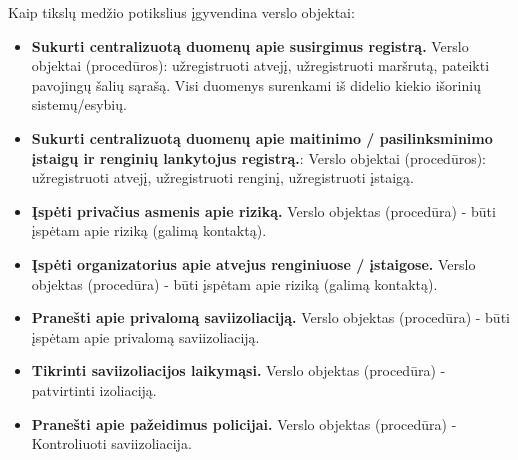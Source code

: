 \documentclass{VUMIFPSkursinis}
\begin{document}
\noindent Kaip tikslų medžio potikslius įgyvendina verslo objektai:
\begin{itemize}
	\item \textbf{Sukurti centralizuotą duomenų apie susirgimus registrą.} Verslo objektai (procedūros):  užregistruoti atvejį, užregistruoti maršrutą, pateikti pavojingų šalių sąrašą. Visi duomenys surenkami iš didelio kiekio išorinių sistemų/esybių.
	\item \textbf{Sukurti centralizuotą duomenų apie maitinimo / pasilinksminimo įstaigų ir renginių lankytojus registrą.}: Verslo objektai (procedūros): užregistruoti atvejį, užregistruoti renginį, užregistruoti įstaigą.
	\item \textbf{Įspėti privačius asmenis apie riziką.} Verslo objektas (procedūra) - būti įspėtam apie riziką (galimą kontaktą).
	\item \textbf{Įspėti organizatorius apie atvejus renginiuose / įstaigose.} Verslo objektas (procedūra) - būti įspėtam apie riziką (galimą kontaktą).
	\item \textbf{Pranešti apie privalomą saviizoliaciją.} Verslo objektas (procedūra) - būti įspėtam apie privalomą saviizoliaciją.
	\item \textbf{Tikrinti saviizoliacijos laikymąsi.}	Verslo objektas (procedūra) - patvirtinti izoliaciją.
	\item \textbf{Pranešti apie pažeidimus policijai.}	Verslo objektas (procedūra) - Kontroliuoti saviizoliacija.
\end{itemize}
\end{document}
